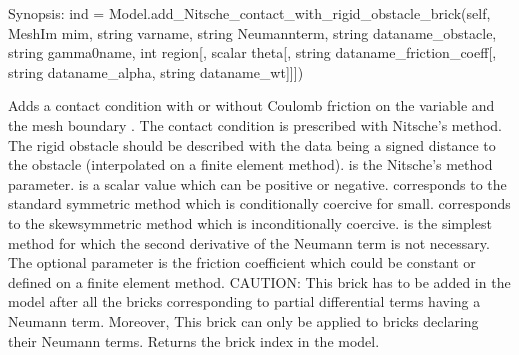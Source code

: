 \documentclass[a4paper,11pt,english]{sphinxmanual}
\begin{document}
\begin{fulllineitems}
\begin{fulllineitems}
\label{\detokenize{python/cmdref_Model:getfem.Model.add_Nitsche_contact_with_rigid_obstacle_brick}}
Synopsis: ind = Model.add\_Nitsche\_contact\_with\_rigid\_obstacle\_brick(self, MeshIm mim, string varname, string Neumannterm, string dataname\_obstacle, string gamma0name,  int region{[}, scalar theta{[}, string dataname\_friction\_coeff{[}, string dataname\_alpha, string dataname\_wt{]}{]}{]})

Adds a contact condition with or without Coulomb friction on the variable
 and the mesh boundary . The contact condition
is prescribed with Nitsche’s method. The rigid obstacle should
be described with the data  being a signed distance to
the obstacle (interpolated on a finite element method).
 is the Nitsche’s method parameter.
 is a scalar value which can be
positive or negative.  corresponds to the standard symmetric
method which is conditionally coercive for   small.
 corresponds to the skew\sphinxhyphen{}symmetric method which is
inconditionally coercive.  is the simplest method
for which the second derivative of the Neumann term is not necessary.
The optional parameter  is the friction
coefficient which could be constant or defined on a finite element
method.
CAUTION: This brick has to be added in the model after all the bricks
corresponding to partial differential terms having a Neumann term.
Moreover, This brick can only be applied to bricks declaring their
Neumann terms. Returns the brick index in the model.

\end{fulllineitems}



\end{fulllineitems}
\end{document}
